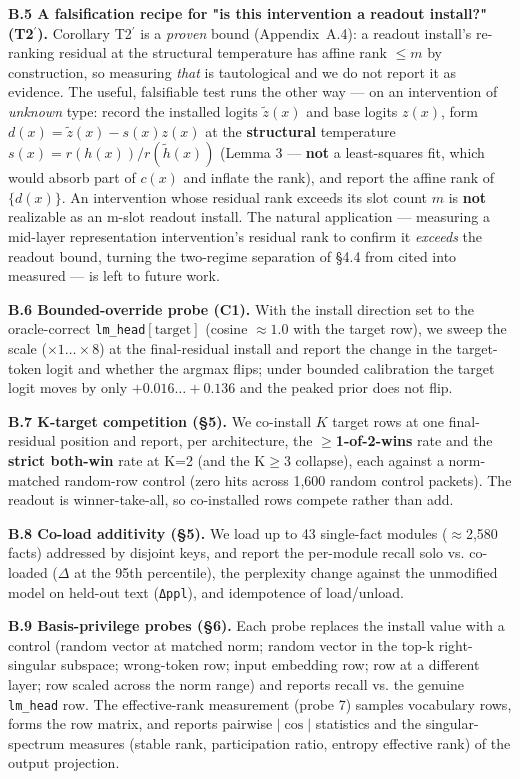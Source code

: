 \documentclass[11pt]{article}
\theoremstyle{plain}
\theoremstyle{definition}
\begin{document}
\textbf{B.5 A falsification recipe for "is this intervention a readout install?" (T2$^{\prime}$).} Corollary T2$^{\prime}$ is a \emph{proven} bound (Appendix~A.4): a readout install's re-ranking residual at the structural temperature has affine rank $\le m$ by construction, so measuring \emph{that} is tautological and we do not report it as evidence. The useful, falsifiable test runs the other way --- on an intervention of \emph{unknown} type: record the installed logits $\tilde z(x)$ and base logits $z(x)$, form $d(x) = \tilde z(x) - s(x)z(x)$ at the \textbf{structural} temperature $s(x) = r(h(x))/r(\tilde h(x))$ (Lemma 3 --- \textbf{not} a least-squares fit, which would absorb part of $c(x)$ and inflate the rank), and report the affine rank of $\{d(x)\}$. An intervention whose residual rank exceeds its slot count $m$ is \textbf{not} realizable as an m-slot readout install. The natural application --- measuring a mid-layer representation intervention's residual rank to confirm it \emph{exceeds} the readout bound, turning the two-regime separation of \S4.4 from cited into measured --- is left to future work.

\textbf{B.6 Bounded-override probe (C1).} With the install direction set to the oracle-correct \texttt{lm\_head}$[\text{target}]$ (cosine $\approx 1.0$ with the target row), we sweep the scale ($\times1\dots\times8$) at the final-residual install and report the change in the target-token logit and whether the argmax flips; under bounded calibration the target logit moves by only $+0.016\dots+0.136$ and the peaked prior does not flip.

\textbf{B.7 K-target competition (\S5).} We co-install $K$ target rows at one final-residual position and report, per architecture, the \textbf{$\ge$1-of-2-wins} rate and the \textbf{strict both-win} rate at K=2 (and the K$\ge$3 collapse), each against a norm-matched random-row control (zero hits across 1,600 random control packets). The readout is winner-take-all, so co-installed rows compete rather than add.

\textbf{B.8 Co-load additivity (\S5).} We load up to 43 single-fact modules ($\approx$2,580 facts) addressed by disjoint keys, and report the per-module recall solo vs. co-loaded ($\Delta$ at the 95th percentile), the perplexity change against the unmodified model on held-out text (\texttt{Δppl}), and idempotence of load/unload.

\textbf{B.9 Basis-privilege probes (\S6).} Each probe replaces the install value with a control (random vector at matched norm; random vector in the top-k right-singular subspace; wrong-token row; input embedding row; row at a different layer; row scaled across the norm range) and reports recall vs. the genuine \texttt{lm\_head} row. The effective-rank measurement (probe 7) samples vocabulary rows, forms the row matrix, and reports pairwise $|\cos|$ statistics and the singular-spectrum measures (stable rank, participation ratio, entropy effective rank) of the output projection.
\end{document}
